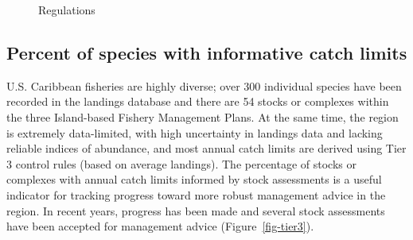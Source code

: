 \documentclass[
  letterpaper,
  oneside,
  open=any]{scrbook}
\begin{document}
\begin{figure}


\caption{\label{fig-FR}Regulations}

\end{figure}%

\subsection{Percent of species with informative catch
limits}\label{percent-of-species-with-informative-catch-limits}

U.S. Caribbean fisheries are highly diverse; over 300 individual species
have been recorded in the landings database and there are 54 stocks or
complexes within the three Island-based Fishery Management Plans. At the
same time, the region is extremely data-limited, with high uncertainty
in landings data and lacking reliable indices of abundance, and most
annual catch limits are derived using Tier 3 control rules (based on
average landings). The percentage of stocks or complexes with annual
catch limits informed by stock assessments is a useful indicator for
tracking progress toward more robust management advice in the region. In
recent years, progress has been made and several stock assessments have
been accepted for management advice (Figure~\ref{fig-tier3}).
\end{document}
